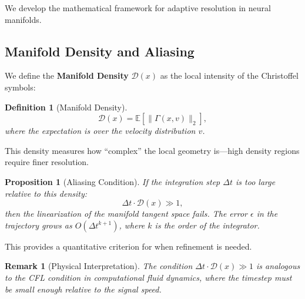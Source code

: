 \documentclass[12pt,letterpaper,twoside]{article}
\newtheorem{definition}{Definition}[section]
\newtheorem{remarque}{Remark}[section]
\newtheorem{prop}{Proposition}[section]
\begin{document}
We develop the mathematical framework for adaptive resolution in neural manifolds.

\subsection{Manifold Density and Aliasing}

We define the \textbf{Manifold Density} $\mathcal{D}(x)$ as the local intensity of the Christoffel symbols:

\begin{definition}[Manifold Density]
\[
\mathcal{D}(x) = \mathbb{E}\left[\|\Gamma(x, v)\|_2\right],
\]
where the expectation is over the velocity distribution $v$.
\end{definition}

This density measures how ``complex'' the local geometry is---high density regions require finer resolution.

\begin{prop}[Aliasing Condition]
If the integration step $\Delta t$ is too large relative to this density:
\[
\Delta t \cdot \mathcal{D}(x) \gg 1,
\]
then the linearization of the manifold tangent space fails. The error $\epsilon$ in the trajectory grows as $O(\Delta t^{k+1})$, where $k$ is the order of the integrator.
\end{prop}

This provides a quantitative criterion for when refinement is needed.

\begin{remarque}[Physical Interpretation]
The condition $\Delta t \cdot \mathcal{D}(x) \gg 1$ is analogous to the CFL condition in computational fluid dynamics, where the timestep must be small enough relative to the signal speed.
\end{remarque}
\end{document}
